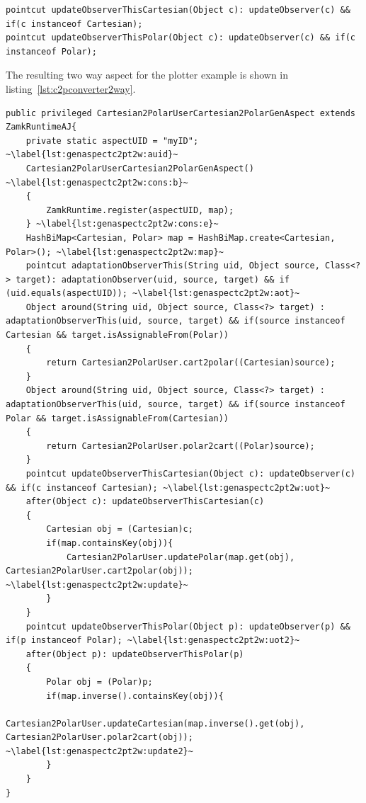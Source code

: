 \begin{lstlisting}[float, caption={\lstinln{updateObserverThis} pointcuts for two-way conversion}, label={lst:updatetwoway}]
pointcut updateObserverThisCartesian(Object c): updateObserver(c) && if(c instanceof Cartesian);
pointcut updateObserverThisPolar(Object c): updateObserver(c) && if(c instanceof Polar);
\end{lstlisting}

The resulting two way aspect for the plotter example is shown in listing~\ref{lst:c2pconverter2way}.
\begin{lstlisting}[float, caption={The aspect generated for the Cartesian to Polar two-way converter}, label={lst:c2pconverter2way}]
public privileged Cartesian2PolarUserCartesian2PolarGenAspect extends ZamkRuntimeAJ{
	private static aspectUID = "myID"; ~\label{lst:genaspectc2pt2w:auid}~
	Cartesian2PolarUserCartesian2PolarGenAspect() ~\label{lst:genaspectc2pt2w:cons:b}~
	{
		ZamkRuntime.register(aspectUID, map);
	} ~\label{lst:genaspectc2pt2w:cons:e}~
	HashBiMap<Cartesian, Polar> map = HashBiMap.create<Cartesian, Polar>(); ~\label{lst:genaspectc2pt2w:map}~
	pointcut adaptationObserverThis(String uid, Object source, Class<?> target): adaptationObserver(uid, source, target) && if (uid.equals(aspectUID)); ~\label{lst:genaspectc2pt2w:aot}~
	Object around(String uid, Object source, Class<?> target) : adaptationObserverThis(uid, source, target) && if(source instanceof Cartesian && target.isAssignableFrom(Polar))
	{
		return Cartesian2PolarUser.cart2polar((Cartesian)source);
	}
	Object around(String uid, Object source, Class<?> target) : adaptationObserverThis(uid, source, target) && if(source instanceof Polar && target.isAssignableFrom(Cartesian))
	{
		return Cartesian2PolarUser.polar2cart((Polar)source);
	}
	pointcut updateObserverThisCartesian(Object c): updateObserver(c) && if(c instanceof Cartesian); ~\label{lst:genaspectc2pt2w:uot}~
	after(Object c): updateObserverThisCartesian(c)
	{
		Cartesian obj = (Cartesian)c;
		if(map.containsKey(obj)){
			Cartesian2PolarUser.updatePolar(map.get(obj), Cartesian2PolarUser.cart2polar(obj)); ~\label{lst:genaspectc2pt2w:update}~
		}	
	}
	pointcut updateObserverThisPolar(Object p): updateObserver(p) && if(p instanceof Polar); ~\label{lst:genaspectc2pt2w:uot2}~
	after(Object p): updateObserverThisPolar(p)
	{
		Polar obj = (Polar)p;
		if(map.inverse().containsKey(obj)){
			Cartesian2PolarUser.updateCartesian(map.inverse().get(obj), Cartesian2PolarUser.polar2cart(obj)); ~\label{lst:genaspectc2pt2w:update2}~
		}	
	}
}
\end{lstlisting}


